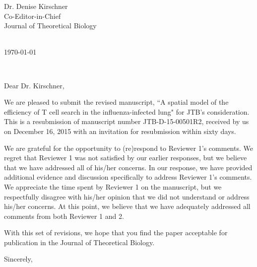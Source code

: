 \documentclass[11pt,a4paper]{letter} %
\def\opening#1{\thispagestyle{empty}
{\centering\fromaddress \vspace{0.6in} \\ %
\hspace*{\longindentation}\today\hspace*{\fill}\par} %
{\raggedright \toname \\ \toaddress \par} %
\vspace{0.4in} %
\noindent #1 %
}
\begin{document}

\begin{letter}
{Dr. Denise Kirschner \\
Co-Editor-in-Chief \\
Journal of Theoretical Biology
}


\opening{Dear Dr. Kirschner,}

We are pleased to submit the revised manuscript, ``A spatial model of the
efficiency of T cell search in the influenza-infected lung" for JTB's 
consideration. This is a resubmission of manuscript number JTB-D-15-00501R2,
received by us on December 16, 2015 with an invitation for resubmission within 
sixty days. 

We are grateful for the opportunity to (re)respond to Reviewer 1's
comments. We regret that Reviewer 1 was not satisfied by our
earlier responses, but we believe that we have addressed all of
his/her concerns.  In our response, we have provided additional evidence and discussion
specifically to address Reviewer 1's comments.  We appreciate the time
spent by Reviewer 1 on the manuscript, but we respectfully disagree
with his/her opinion that we did not understand or address his/her
concerns.   At this point, we believe that we 
have adequately addressed all comments from both Reviewer 1 and 2.


With this set of revisions, we hope that you find the paper acceptable 
for publication in the Journal of Theoretical Biology.

\closing{Sincerely,}


\end{letter}
\end{document}
